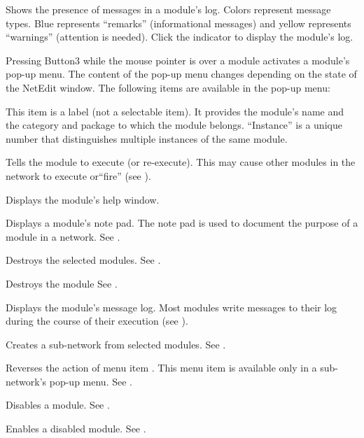 \begin{description}
   Shows the presence of messages in a
  module's log.  Colors represent message types.  Blue represents
  ``remarks'' (informational messages) and yellow represents ``warnings''
  (attention is needed).  Click the indicator to display the
  module's log.
  
   Pressing Button3 while the mouse pointer is
  over a module activates a module's pop-up menu.  The content
  of the pop-up menu changes depending on the state of the NetEdit
  window. The following items are available in the pop-up menu:

  \begin{description}
     This item is a
    label (not a selectable item).  It provides the module's name and
    the category and package to which the module belongs.
    ``Instance'' is a unique number that distinguishes multiple
    instances of the same module.
    
     Tells the module to execute (or
    re-execute).  This may cause other modules in the network to
    execute or``fire'' (see ).

     Displays the module's help window.
    
     Displays a module's note pad.  The note pad
    is used to document the purpose of a module in a network.  See
    .

     Destroys the selected modules.
    See .
    
     Destroys the module See .
    
     Displays the module's message log.  Most
    modules write messages to their log during the course of
    their execution (see ).
    
     Creates a sub-network from
    selected modules.  See .
    
     Reverses the action of menu item
    .  This menu item is available only in
    a sub-network's pop-up menu.  See .
    
     Disables a module.  See
    .
    
     Enables a disabled module.  See
    .

  \end{description}
\end{description}


